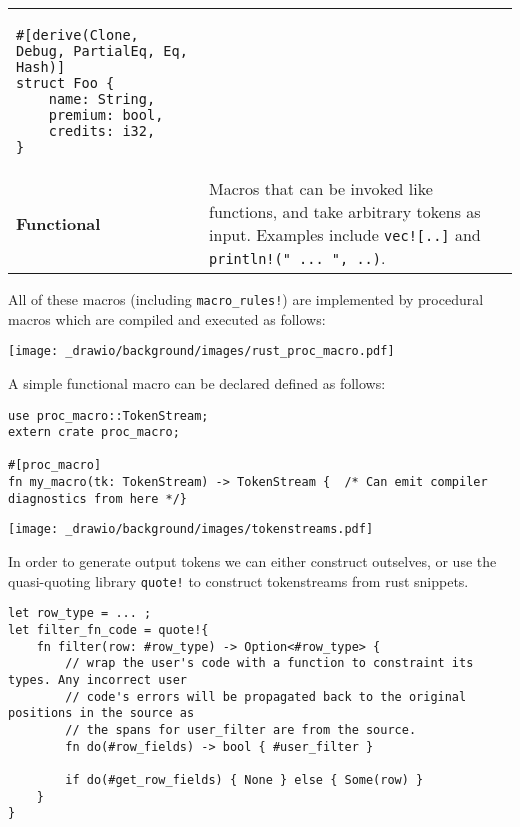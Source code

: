 \begin{longtable}{l p{}}
{    \begin{verbatim}
#[derive(Clone, Debug, PartialEq, Eq, Hash)]
struct Foo {
    name: String,
    premium: bool,
    credits: i32,
}
        \end{verbatim}
    }                                                                                                                                                                                                  \\
    \textbf{Functional}  & { Macros that can be invoked like functions, and take arbitrary tokens as input. Examples include \texttt{vec![..]} and \texttt{println!(" ... ", ..)}.
    }                                                                                                                                                                                                  \\
\end{longtable}
\noindent
All of these macros (including \texttt{macro_rules!}) are implemented by procedural macros which are compiled and executed as follows:
\begin{center}
    \texttt{[image: \_drawio/background/images/rust\_proc\_macro.pdf]}
\end{center}
A simple functional macro can be declared defined as follows:
\begin{verbatim}
use proc_macro::TokenStream;
extern crate proc_macro;

#[proc_macro]
fn my_macro(tk: TokenStream) -> TokenStream {  /* Can emit compiler diagnostics from here */}
\end{verbatim}
\begin{center}
    \texttt{[image: \_drawio/background/images/tokenstreams.pdf]}
\end{center}
In order to generate output tokens we can either construct outselves, or use the quasi-quoting library \texttt{quote!} to construct tokenstreams from rust snippets.
\begin{verbatim}
let row_type = ... ;
let filter_fn_code = quote!{
    fn filter(row: #row_type) -> Option<#row_type> {
        // wrap the user's code with a function to constraint its types. Any incorrect user 
        // code's errors will be propagated back to the original positions in the source as 
        // the spans for user_filter are from the source.
        fn do(#row_fields) -> bool { #user_filter }

        if do(#get_row_fields) { None } else { Some(row) }
    }
}
\end{verbatim}
